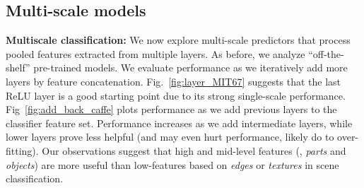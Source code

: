\documentclass[10pt,twocolumn,letterpaper]{article}
\begin{document}
\subsection{Multi-scale models} 

{\bf Multiscale classification:} We now explore multi-scale predictors that process pooled features extracted from multiple layers. As before, we analyze ``off-the-shelf'' pre-trained models. We evaluate performance as we iteratively add more layers \textcolor[rgb]{1,0,0}{by feature concatenation}. Fig.~\ref{fig:layer_MIT67} suggests that the last ReLU layer is a good starting point due to its strong single-scale performance. Fig~\ref{fig:add_back_caffe} plots performance as we add previous layers to the classifier feature set. Performance increases as we add intermediate layers, while lower layers prove less helpful (and may even hurt performance, likely do to over-fitting). Our observations suggest that high and mid-level features (\ie, \textit{parts} and \textit{objects}) are more useful than low-features based on \textit{edges} or \textit{textures} in scene classification. 




\end{document}
